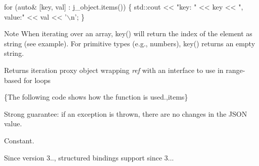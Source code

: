 \begin{DoxyCode}
\textcolor{keywordflow}{for} (\textcolor{keyword}{auto}& [key, val] : j\_object.items())
\{
    std::cout << \textcolor{stringliteral}{"key: "} << key << \textcolor{stringliteral}{", value:"} << val << \textcolor{charliteral}{'\(\backslash\)n'};
\}
\end{DoxyCode}


\begin{DoxyNote}{Note}
When iterating over an array, {\ttfamily key()} will return the index of the element as string (see example). For primitive types (e.\+g., numbers), {\ttfamily key()} returns an empty string.
\end{DoxyNote}
\begin{DoxyReturn}{Returns}
iteration proxy object wrapping {\itshape ref} with an interface to use in range-\/based for loops
\end{DoxyReturn}
\{The following code shows how the function is used.,items\}

Strong guarantee\+: if an exception is thrown, there are no changes in the J\+S\+ON value.

Constant.

\begin{DoxySince}{Since}
version 3.., structured bindings support since 3... 
\end{DoxySince}
\mbox{\label{classnlohmann_1_1basic__json_a71dd7adfca43660c10e6624f4b5c290c}} 
